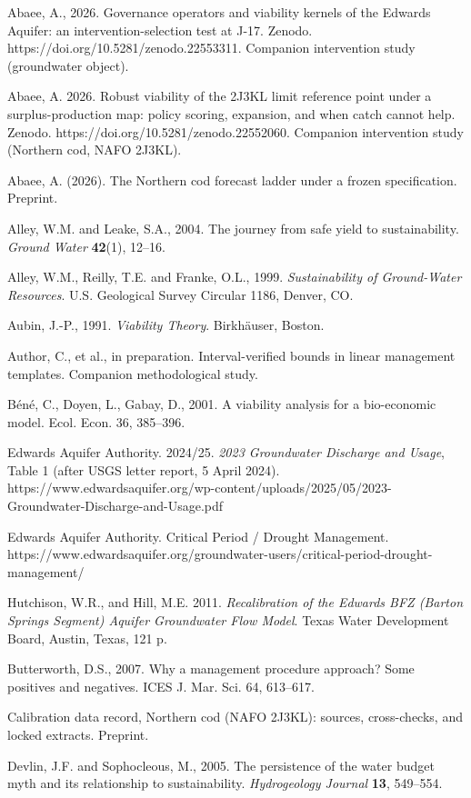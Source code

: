 Abaee, A., 2026. Governance operators and viability kernels of the
Edwards Aquifer: an intervention-selection test at J-17. Zenodo.
https://doi.org/10.5281/zenodo.22553311. Companion intervention study
(groundwater object).

Abaee, A. 2026. Robust viability of the 2J3KL limit reference point
under a surplus-production map: policy scoring, expansion, and when
catch cannot help. Zenodo. https://doi.org/10.5281/zenodo.22552060.
Companion intervention study (Northern cod, NAFO 2J3KL).

Abaee, A. (2026). The Northern cod forecast ladder under a frozen
specification. Preprint.

Alley, W.M. and Leake, S.A., 2004. The journey from safe yield to sustainability.
\emph{Ground Water} \textbf{42}(1), 12--16.

Alley, W.M., Reilly, T.E. and Franke, O.L., 1999. \emph{Sustainability of Ground-Water
Resources}. U.S. Geological Survey Circular 1186, Denver, CO.

Aubin, J.-P., 1991. \emph{Viability Theory}. Birkh\"auser, Boston.


Author, C., et al., in preparation. Interval-verified bounds in linear
management templates. Companion methodological study.

B\'en\'e, C., Doyen, L., Gabay, D., 2001. A viability analysis for a
bio-economic model. Ecol. Econ. 36, 385--396.

Edwards Aquifer Authority. 2024/25. \emph{2023 Groundwater Discharge and
Usage}, Table 1 (after USGS letter report, 5 April 2024).
https://www.edwardsaquifer.org/wp-content/uploads/2025/05/2023-Groundwater-Discharge-and-Usage.pdf

Edwards Aquifer Authority. Critical Period / Drought Management.
https://www.edwardsaquifer.org/groundwater-users/critical-period-drought-management/

Hutchison, W.R., and Hill, M.E. 2011. \emph{Recalibration of the Edwards
BFZ (Barton Springs Segment) Aquifer Groundwater Flow Model}. Texas
Water Development Board, Austin, Texas, 121 p.

Butterworth, D.S., 2007. Why a management procedure approach? Some positives and negatives.
ICES J. Mar. Sci. 64, 613--617.

Calibration data record, Northern cod (NAFO 2J3KL):
sources, cross-checks, and locked extracts. Preprint.

Devlin, J.F. and Sophocleous, M., 2005. The persistence of the water budget myth and its
relationship to sustainability. \emph{Hydrogeology Journal} \textbf{13}, 549--554.

